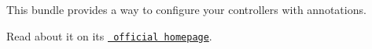 This bundle provides a way to configure your controllers with annotations.

Read about it on its \href{http://symfony.com/doc/current/bundles/SensioFrameworkExtraBundle/index.html}{\texttt{ official homepage}}. 